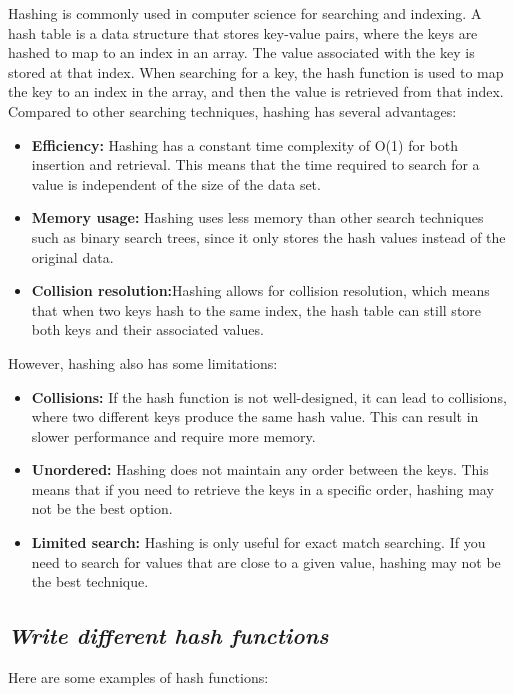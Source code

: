 \documentclass{article}
\begin{document}
Hashing is commonly used in computer science for searching and indexing. A hash table is a data structure that stores key-value pairs, where the keys are hashed to map to an index in an array. The value associated with the key is stored at that index. When searching for a key, the hash function is used to map the key to an index in the array, and then the value is retrieved from that index.\\

Compared to other searching techniques, hashing has several advantages:
\begin{itemize}
	\item \textbf{Efficiency:} Hashing has a constant time complexity of O(1) for both insertion and retrieval. This means that the time required to search for a value is independent of the size of the data set.
	\item \textbf{Memory usage:} Hashing uses less memory than other search techniques such as binary search trees, since it only stores the hash values instead of the original data.
	\item \textbf{Collision resolution:}Hashing allows for collision resolution, which means that when two keys hash to the same index, the hash table can still store both keys and their associated values.
\end{itemize}
However, hashing also has some limitations:
\begin{itemize}
	\item \textbf{Collisions:} If the hash function is not well-designed, it can lead to collisions, where two different keys produce the same hash value. This can result in slower performance and require more memory.
	\item \textbf{Unordered:} Hashing does not maintain any order between the keys. This means that if you need to retrieve the keys in a specific order, hashing may not be the best option.
	\item \textbf{Limited search:} Hashing is only useful for exact match searching. If you need to search for values that are close to a given value, hashing may not be the best technique.
\end{itemize}
\subsection{\textit{Write different hash functions}}
Here are some examples of hash functions:
\end{document}
